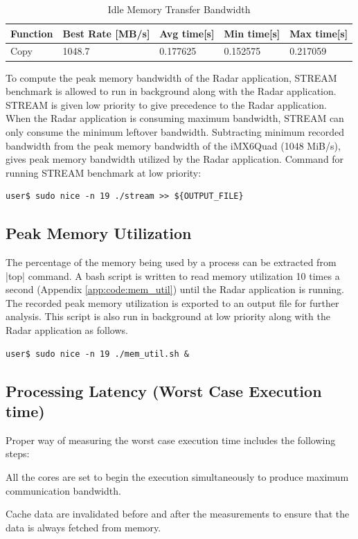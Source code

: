 \begin{table}[h!]
	\centering
	\begin{tabular}{|l|l|l|l|l|} 
	 \hline
	 \textbf{Function} & \textbf{Best Rate [MB/s]} & \textbf{Avg time[s]} & \textbf{Min time[s]} & \textbf{Max time[s]} \\
	 \hline
	 Copy & 1048.7 & 0.177625 & 0.152575 & 0.217059 \\ \hline
	\end{tabular}
	\caption{Idle Memory Transfer Bandwidth}
	\label{tbl:mm:bw_no_load}
\end{table}

To compute the peak memory bandwidth of the Radar application, STREAM benchmark is allowed to run in background along with the Radar application. STREAM is given low priority to give precedence to the Radar application. When the Radar application is consuming maximum bandwidth, STREAM can only consume the minimum leftover bandwidth. Subtracting minimum recorded bandwidth from the peak memory bandwidth of the iMX6Quad (1048 MiB/s), gives peak memory bandwidth utilized by the Radar application. Command for running STREAM benchmark at low priority: \\
\begin{lstlisting}
user$ sudo nice -n 19 ./stream >> ${OUTPUT_FILE}
\end{lstlisting}

\subsection{Peak Memory Utilization}
\label{ss:mm:mem_util}
The percentage of the memory being used by a process can be extracted from \bverb|top| command. A bash script is written to read memory utilization 10 times a second (Appendix \ref{app:code:mem_util}) until the Radar application is running. The recorded peak memory utilization is exported to an output file for further analysis. This script is also run in background at low priority along with the Radar application as follows.\\
\begin{lstlisting}
user$ sudo nice -n 19 ./mem_util.sh &
\end{lstlisting}

\subsection{Processing Latency (Worst Case Execution time)}
\label{ss:mm:latency}
Proper way of measuring the worst case execution time includes the following steps:
\begin{compactitem} 
	\item All the cores are set to begin the execution simultaneously to produce maximum communication bandwidth.
	\item Cache data are invalidated before and after the measurements to ensure that the data is always fetched from memory.
\end{compactitem} 

